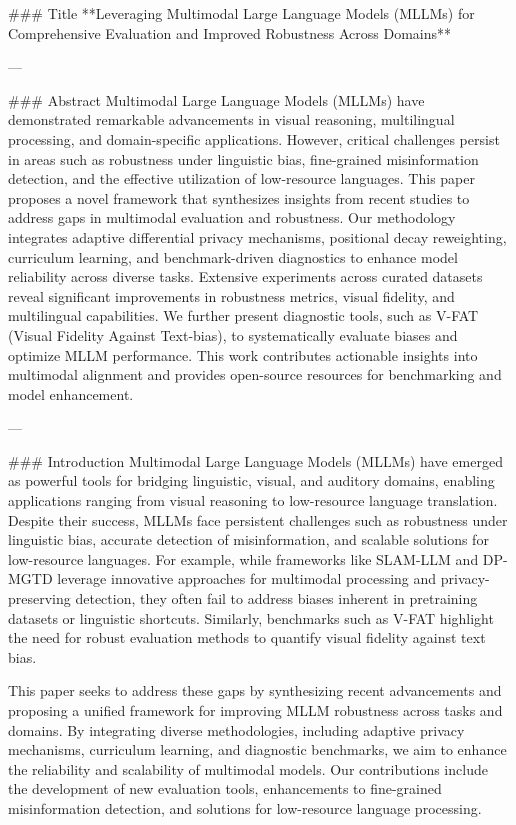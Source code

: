 ### Title
**Leveraging Multimodal Large Language Models (MLLMs) for Comprehensive Evaluation and Improved Robustness Across Domains**

---

### Abstract
Multimodal Large Language Models (MLLMs) have demonstrated remarkable advancements in visual reasoning, multilingual processing, and domain-specific applications. However, critical challenges persist in areas such as robustness under linguistic bias, fine-grained misinformation detection, and the effective utilization of low-resource languages. This paper proposes a novel framework that synthesizes insights from recent studies to address gaps in multimodal evaluation and robustness. Our methodology integrates adaptive differential privacy mechanisms, positional decay reweighting, curriculum learning, and benchmark-driven diagnostics to enhance model reliability across diverse tasks. Extensive experiments across curated datasets reveal significant improvements in robustness metrics, visual fidelity, and multilingual capabilities. We further present diagnostic tools, such as V-FAT (Visual Fidelity Against Text-bias), to systematically evaluate biases and optimize MLLM performance. This work contributes actionable insights into multimodal alignment and provides open-source resources for benchmarking and model enhancement.

---

### Introduction
Multimodal Large Language Models (MLLMs) have emerged as powerful tools for bridging linguistic, visual, and auditory domains, enabling applications ranging from visual reasoning to low-resource language translation. Despite their success, MLLMs face persistent challenges such as robustness under linguistic bias, accurate detection of misinformation, and scalable solutions for low-resource languages. For example, while frameworks like SLAM-LLM and DP-MGTD leverage innovative approaches for multimodal processing and privacy-preserving detection, they often fail to address biases inherent in pretraining datasets or linguistic shortcuts. Similarly, benchmarks such as V-FAT highlight the need for robust evaluation methods to quantify visual fidelity against text bias.

This paper seeks to address these gaps by synthesizing recent advancements and proposing a unified framework for improving MLLM robustness across tasks and domains. By integrating diverse methodologies, including adaptive privacy mechanisms, curriculum learning, and diagnostic benchmarks, we aim to enhance the reliability and scalability of multimodal models. Our contributions include the development of new evaluation tools, enhancements to fine-grained misinformation detection, and solutions for low-resource language processing.


